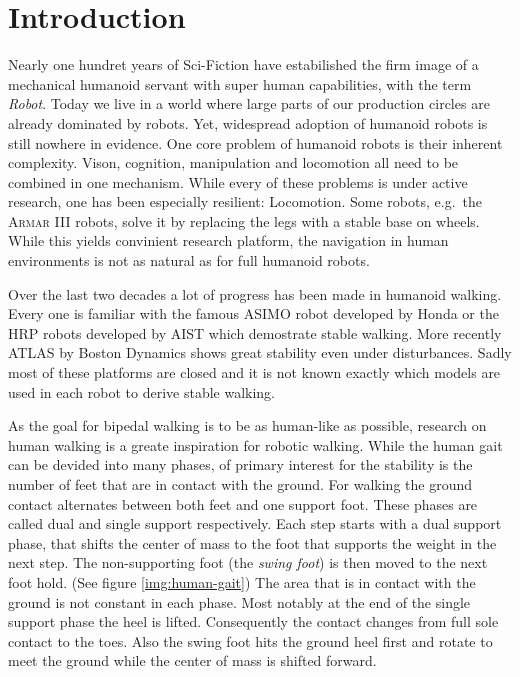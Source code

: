 \documentclass[english,ngerman]{KITreprt}
\newcommand{\name}[1]{\textsc{#1}}
\begin{document}



\maketitle

\tableofcontents

\chapter{Introduction}\label{introduction}

Nearly one hundret years of Sci-Fiction have estabilished the firm image
of a mechanical humanoid servant with super human capabilities, with the
term \emph{Robot}. Today we live in a world where large parts of our
production circles are already dominated by robots. Yet, widespread
adoption of humanoid robots is still nowhere in evidence. One core
problem of humanoid robots is their inherent complexity. Vison,
cognition, manipulation and locomotion all need to be combined in one
mechanism. While every of these problems is under active research, one
has been especially resilient: Locomotion. Some robots, e.g.~the
\name{Armar III} robots, solve it by replacing the legs with a stable
base on wheels. While this yields convinient research platform, the
navigation in human environments is not as natural as for full humanoid
robots.

Over the last two decades a lot of progress has been made in humanoid
walking. Every one is familiar with the famous \name{ASIMO} robot
developed by Honda or the HRP robots developed by AIST which demostrate
stable walking. More recently \name{ATLAS} by Boston Dynamics shows
great stability even under disturbances. Sadly most of these platforms
are closed and it is not known exactly which models are used in each
robot to derive stable walking.

As the goal for bipedal walking is to be as human-like as possible,
research on human walking is a greate inspiration for robotic walking.
While the human gait can be devided into many phases, of primary
interest for the stability is the number of feet that are in contact
with the ground. For walking the ground contact alternates between both
feet and one support foot. These phases are called dual and single
support respectively. Each step starts with a dual support phase, that
shifts the center of mass to the foot that supports the weight in the
next step. The non-supporting foot (the \emph{swing foot}) is then moved
to the next foot hold. (See figure \ref{img:human-gait}) The area that
is in contact with the ground is not constant in each phase. Most
notably at the end of the single support phase the heel is lifted.
Consequently the contact changes from full sole contact to the toes.
Also the swing foot hits the ground heel first and rotate to meet the
ground while the center of mass is shifted forward.
\end{document}
